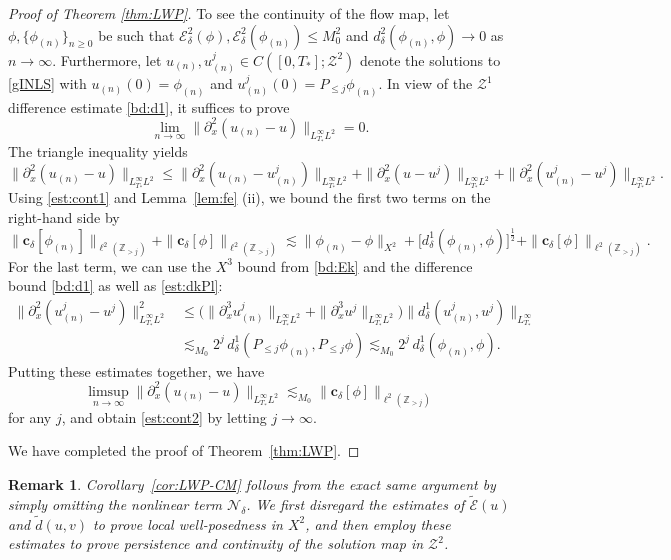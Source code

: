 \documentclass{amsart}
\newtheorem{remark}{Remark}[section]
\numberwithin{equation}{section}
\newcommand{\Z}{\mathbb{Z}}
\begin{document}
\begin{proof}[Proof of Theorem \ref{thm:LWP}]
To see the continuity of the flow map, let $\phi, \{ \phi_{(n)} \}_{n\geq 0}$ be such that $\mathcal{E}^2_\delta(\phi), \mathcal{E}^2_\delta(\phi_{(n)})\leq M_0^2$ and $d^2_\delta(\phi_{(n)},\phi)\to 0$ as $n\to \infty$. 
Furthermore, let $u_{(n)}, u_{(n)}^{j} \in C([0,T_*];\mathcal{Z}^2)$ denote the solutions to \eqref{gINLS} with $u_{(n)}(0)=\phi_{(n)}$ and $u_{(n)}^{j}(0)=P_{\leq j}\phi_{(n)}$. 
In view of the $\mathcal{Z}^1$ difference estimate \eqref{bd:d1}, it suffices to prove
\begin{equation}\label{est:cont2}
\lim_{n\to \infty}\| \partial_x^2(u_{(n)} - u) \|_{L_{T_*}^{\infty}L^2}=0. 
\end{equation}
The triangle inequality yields
\[ \| \partial_x^2(u_{(n)} - u) \|_{L_{T_*}^{\infty}L^2}\leq \| \partial_x^2(u_{(n)}-u_{(n)}^j)\|_{L^\infty_{T_*}L^2}+\| \partial_x^2(u-u^j)\|_{L^\infty_{T_*}L^2}+\| \partial_x^2(u_{(n)}^j-u^j)\|_{L^\infty_{T_*}L^2} .\]
Using \eqref{est:cont1} and Lemma~\ref{lem:fe} (ii), we bound the first two terms on the right-hand side by
\[ \| \mathbf{c}_\delta[\phi_{(n)}]\|_{\ell^2(\Z_{>j})}+\| \mathbf{c}_\delta[\phi]\|_{\ell^2(\Z_{>j})} \lesssim \| \phi_{(n)}-\phi\|_{X^2}+\big[ d^1_\delta(\phi_{(n)},\phi)\big]^{\frac12}+\| \mathbf{c}_\delta[\phi]\|_{\ell^2(\Z_{>j})}.\]
For the last term, we can use the $X^3$ bound from \eqref{bd:Ek} and the difference bound \eqref{bd:d1} as well as \eqref{est:dkPl}:
\begin{equation}\label{est:cont3}
\begin{aligned}
\| \partial_x^2(u_{(n)}^j-u^j)\|_{L^\infty_{T_*}L^2}^2&\leq \big( \| \partial_x^3u_{(n)}^j\|_{L^\infty_{T_*}L^2}+\| \partial_x^3u^j\|_{L^\infty_{T_*}L^2}\big) \| d^1_\delta(u_{(n)}^j,u^j)\|_{L^\infty_{T_*}} \\
&\lesssim_{M_0} 2^j\, d^1_\delta(P_{\leq j}\phi_{(n)},P_{\leq j}\phi) 
\lesssim_{M_0} 2^j\,d^1_\delta(\phi_{(n)},\phi).
\end{aligned}
\end{equation} 
Putting these estimates together, we have
\[ \limsup_{n\to \infty}\| \partial_x^2(u_{(n)}-u)\|_{L^\infty_{T_*}L^2}\lesssim_{M_0} \| \mathbf{c}_\delta[\phi]\|_{\ell^2(\Z_{>j})} \]
for any $j$, and obtain \eqref{est:cont2} by letting $j\to \infty$.

We have completed the proof of Theorem~\ref{thm:LWP}.
\end{proof}

\begin{remark}
Corollary~\ref{cor:LWP-CM} follows from the exact same argument by simply omitting the nonlinear term $\mathcal{N}_\delta$. 
We first disregard the estimates of $\widetilde{\mathcal{E}}(u)$ and $\widetilde{d}(u,v)$ to prove local well-posedness in $X^2$, and then employ these estimates to prove persistence and continuity of the solution map in $\mathcal{Z}^2$.
\end{remark}
\end{document}
